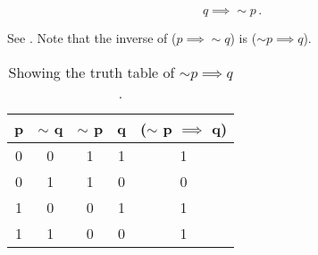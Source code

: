 %
%

\begin{subquestions}
	

\subquestion

\begin{equation}
	q \implies \sim p\,. 
\end{equation}


\subquestion

See . Note that the inverse of ($p \implies \sim q$) is ($\sim p \implies q$).

\begin{table}[ht]
	\centering
	\begin{tabular}{|c|c|c|c|c|}
		\hline
		p & $\sim$ q & $\sim$ p & q & ($\sim$ p $\implies$ q) \\
		\hline
		0 & 0 & 1 & 1 & 1 \\
		0 & 1 & 1 & 0 & 0 \\
		1 & 0 & 0 & 1 & 1 \\
		1 & 1 & 0 & 0 & 1 \\
		\hline
	\end{tabular}
	\caption{\label{2014:q1:tab:Tab1} Showing the truth table of $\sim p \implies q$.}
\end{table}
		
		

\end{subquestions}
